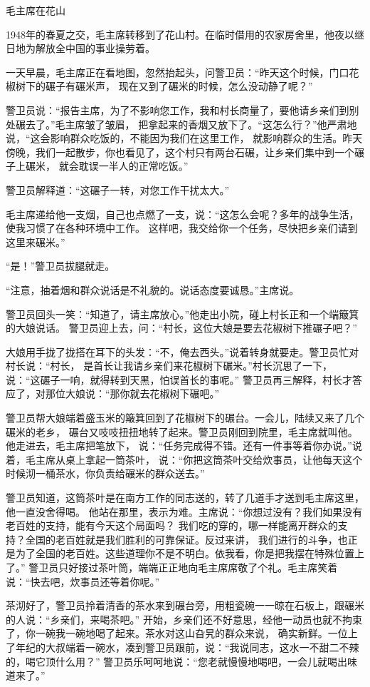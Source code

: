 \documentclass[12pt,UTF8]{ctexbook}
\begin{document}
毛主席在花山

1948年的春夏之交，毛主席转移到了花山村。在临时借用的农家房舍里，他夜以继日地为解放全中国的事业操劳着。

一天早晨，毛主席正在看地图，忽然抬起头，问警卫员：“昨天这个时候，门口花椒树下的碾子有碾米声，
现在又到了碾米的时候，怎么没动静了呢？”

警卫员说：“报告主席，为了不影响您工作，我和村长商量了，要他请乡亲们到别处碾去了。”毛主席皱了皱眉，
把拿起来的香烟又放下了。“这怎么行？”他严肃地说，“这会影响群众吃饭的，不能因为我们在这里工作，
就影响群众的生活。昨天傍晚，我们一起散步，你也看见了，这个村只有两台石碾，让乡亲们集中到一个碾子上碾米，
就会耽误一半人的正常吃饭。”

警卫员解释道：“这碾子一转，对您工作干扰太大。”

毛主席递给他一支烟，自己也点燃了一支，说：“这怎么会呢？多年的战争生活，使我习惯了在各种环境中工作。
这样吧，我交给你一个任务，尽快把乡亲们请到这里来碾米。”

“是！”警卫员拔腿就走。

“注意，抽着烟和群众说话是不礼貌的。说话态度要诚恳。”主席说。

警卫员回头一笑：“知道了，请主席放心。”他走出小院，碰上村长正和一个端簸箕的大娘说话。
警卫员迎上去，问：“村长，这位大娘是要去花椒树下推碾子吧？”

大娘用手拢了拢搭在耳下的头发：“不，俺去西头。”说着转身就要走。警卫员忙对村长说：“村长，
是首长让我请乡亲们来花椒树下碾米。”村长沉思了一下，说：“这碾子一响，就得转到天黑，怕误首长的事呢。”
警卫员再三解释，村长才答应了，对那位大娘说：“那你就去花椒树下碾吧。”

警卫员帮大娘端着盛玉米的簸箕回到了花椒树下的碾台。一会儿，陆续又来了几个碾米的老乡，
碾台又吱吱扭扭地转了起来。警卫员刚回到院里，毛主席就叫他。他走进去，毛主席把笔放下，
说：“任务完成得不错。还有一件事等着你办说。”说着，毛主席从桌上拿起一筒茶叶，
说：“你把这筒茶叶交给炊事员，让他每天这个时候沏一桶茶水，你负责给碾米的群众送去。”

警卫员知道，这筒茶叶是在南方工作的同志送的，转了几道手才送到毛主席这里，他一直没舍得喝。
他站在那里，表示为难。主席说：“你想过没有？我们如果没有老百姓的支持，能有今天这个局面吗？
我们吃的穿的，哪一样能离开群众的支持？全国的老百姓就是我们胜利的可靠保证。反过来讲，
我们进行的斗争，也正是为了全国的老百姓。这些道理你不是不明白。依我看，你是把我摆在特殊位置上了。”
警卫员只好接过茶叶筒，端端正正地向毛主席席敬了个礼。毛主席笑着说：“快去吧，炊事员还等着你呢。”

茶沏好了，警卫员拎着清香的茶水来到碾台旁，用粗瓷碗一一晾在石板上，跟碾米的人说：“乡亲们，来喝茶吧。”
开始，乡亲们还不好意思，经他一动员也就不拘束了，你一碗我一碗地喝了起来。茶水对这山旮旯的群众来说，
确实新鲜。一位上了年纪的大叔端着一碗水，凑到警卫员跟前，说：“我说同志，这水一不甜二不辣的，喝它顶什么用？”
警卫员乐呵呵地说：“您老就慢慢地喝吧，一会儿就喝出味道来了。”
\end{document}
